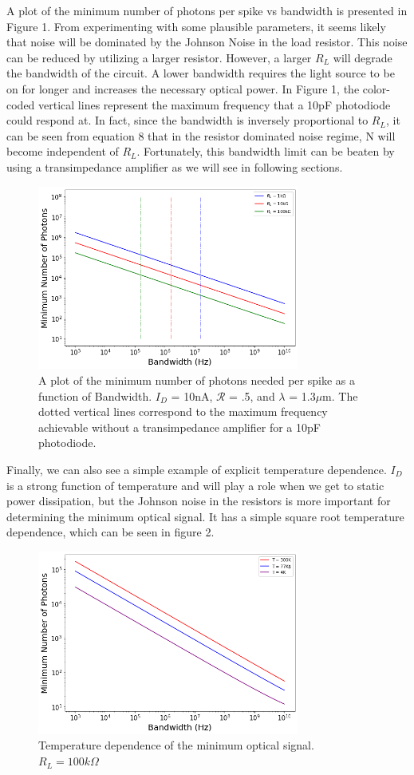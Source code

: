 \documentclass[onecolumn]{article}
\begin{document}
A plot of the minimum number of photons per spike vs bandwidth is presented in Figure 1. From experimenting with some plausible parameters, it seems likely that noise will be dominated by the Johnson Noise in the load resistor. This noise can be reduced by utilizing a larger resistor. However, a larger $R_L$ will degrade the bandwidth of the circuit. A lower bandwidth requires the light source to be on for longer and increases the necessary optical power. In Figure 1, the color-coded vertical lines represent the maximum frequency that a 10pF photodiode could respond at. In fact, since the bandwidth is inversely proportional to $R_L$, it can be seen from equation 8 that in the resistor dominated noise regime, N will become independent of $R_L$. Fortunately, this bandwidth limit can be beaten by using a transimpedance amplifier as we will see in following sections.
\begin{figure}
    \centering
    \includegraphics[width=8.6cm]{photon_V_BW.png}
    \caption{A plot of the minimum number of photons needed per spike as a function of Bandwidth. $I_D$ = 10nA, $\mathcal{R}$ = .5, and $\lambda$ = 1.3$\mu$m. The dotted vertical lines correspond to the maximum frequency achievable without a transimpedance amplifier for a 10pF photodiode. }
    \label{fig:my_label}
\end{figure}

Finally, we can also see a simple example of explicit temperature dependence. $I_D$ is a strong function of temperature and will play a role when we get to static power dissipation, but the Johnson noise in the resistors is more important for determining the minimum optical signal. It has a simple square root temperature dependence, which can be seen in figure 2.
\begin{figure}
    \centering
    \includegraphics[width=8.6cm]{Temp_Photon_spike.png}
    \caption{Temperature dependence of the minimum optical signal. $R_L = 100k\Omega$}
    \label{fig:my_label}
\end{figure}
\end{document}

